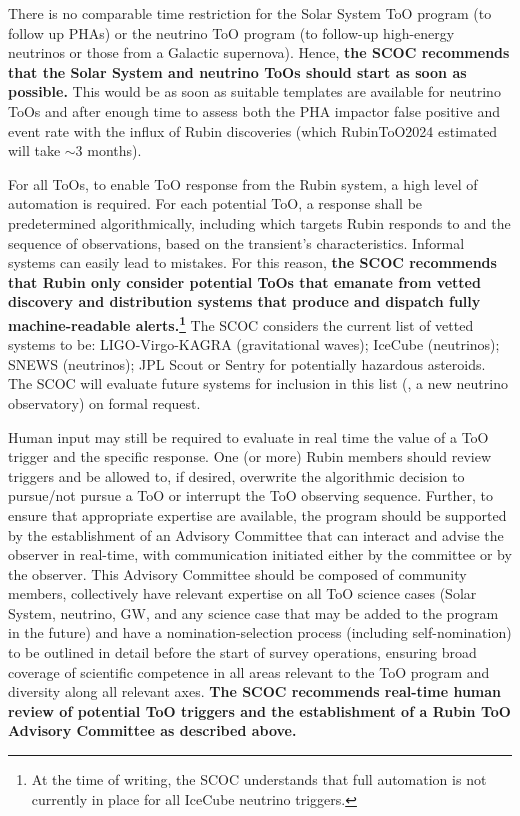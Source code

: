 There is no comparable time restriction for the Solar System ToO program (to follow up PHAs) or the neutrino ToO program (to follow-up high-energy neutrinos or those from a Galactic supernova). Hence, 
\textbf{ the SCOC recommends that the Solar System and neutrino ToOs should start as soon as possible.} This would be as soon as suitable templates are available for neutrino ToOs and after enough time to assess both the PHA impactor false positive and event rate with the influx of Rubin discoveries (which RubinToO2024 estimated will take \mbox{$\sim$3} months).



For all ToOs, to enable ToO response from the Rubin system, a high level of automation is required. For each potential ToO, a response shall be predetermined algorithmically, including which targets Rubin responds to and the sequence of observations, based on the transient’s characteristics. Informal systems can easily lead to mistakes. For this reason, {\bf the SCOC recommends that Rubin only consider potential ToOs that emanate from vetted discovery and distribution systems that produce and dispatch fully machine-readable alerts.\footnote{At the time of writing, the SCOC understands that full automation is not currently in place for all IceCube neutrino triggers.}} The SCOC considers the current list of vetted systems to be: LIGO-Virgo-KAGRA (gravitational waves); IceCube (neutrinos); SNEWS (neutrinos); JPL Scout or Sentry for potentially hazardous asteroids. The SCOC will evaluate future systems for inclusion in this list (\eg , a new neutrino observatory) on formal request.

Human input may still be required to evaluate in real time the value of a ToO trigger and the specific response.  One (or more) Rubin members %
should review triggers and be allowed to, if desired, overwrite the algorithmic decision to pursue/not pursue a ToO or interrupt the ToO observing sequence. Further, to ensure that appropriate expertise are available, the program should be supported by the establishment of an Advisory Committee that can interact and advise the observer in real-time, with communication initiated either by the committee or by the observer. 
This Advisory Committee should be composed of community members, collectively have relevant expertise on all ToO science cases (Solar System, neutrino, GW, and any science case that may be added to the program in the future) and have a nomination-selection process (including self-nomination) to be outlined in detail before the start of survey operations, ensuring broad coverage of scientific competence in all areas relevant to the ToO program and diversity along all relevant axes. 
{\bf The SCOC recommends real-time human review of potential ToO triggers and the establishment of a Rubin ToO Advisory Committee as described above.} 

